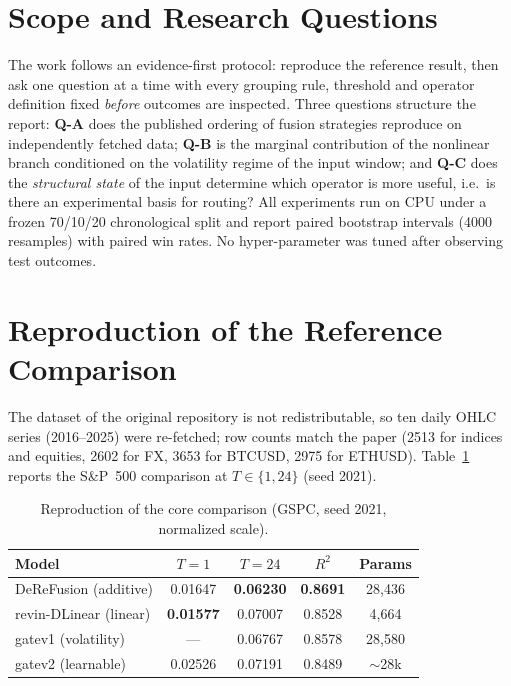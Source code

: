 \documentclass[conference]{IEEEtran}
\begin{document}
\section{Scope and Research Questions}
The work follows an evidence-first protocol: reproduce the reference result, then ask one
question at a time with every grouping rule, threshold and operator definition fixed \emph{before}
outcomes are inspected. Three questions structure the report: \textbf{Q-A} does the published
ordering of fusion strategies reproduce on independently fetched data; \textbf{Q-B} is the
marginal contribution of the nonlinear branch conditioned on the volatility regime of the input
window; and \textbf{Q-C} does the \emph{structural state} of the input determine which operator is
more useful, i.e.\ is there an experimental basis for routing? All experiments run on CPU under a
frozen 70/10/20 chronological split and report paired bootstrap intervals (4000 resamples) with
paired win rates. No hyper-parameter was tuned after observing test outcomes.

\section{Reproduction of the Reference Comparison}
The dataset of the original repository is not redistributable, so ten daily OHLC series
(2016--2025) were re-fetched; row counts match the paper (2513 for indices and equities, 2602 for
FX, 3653 for BTCUSD, 2975 for ETHUSD). Table~\ref{tab:repro} reports the S\&P~500 comparison at
$T\in\{1,24\}$ (seed 2021).

\begin{table}[!t]
\caption{Reproduction of the core comparison (GSPC, seed 2021, normalized scale).}
\label{tab:repro}
\centering
\small
\begin{tabular}{@{}lcccc@{}}
\toprule
Model & $T{=}1$ & $T{=}24$ & $R^2$ & Params \\
\midrule
DeReFusion (additive)   & 0.01647 & \textbf{0.06230} & \textbf{0.8691} & 28{,}436 \\
revin-DLinear (linear)  & \textbf{0.01577} & 0.07007 & 0.8528 & 4{,}664 \\
gatev1 (volatility)     & ---     & 0.06767 & 0.8578 & 28{,}580 \\
gatev2 (learnable)      & 0.02526 & 0.07191 & 0.8489 & $\sim$28k \\
\bottomrule
\end{tabular}
\end{table}
\end{document}
